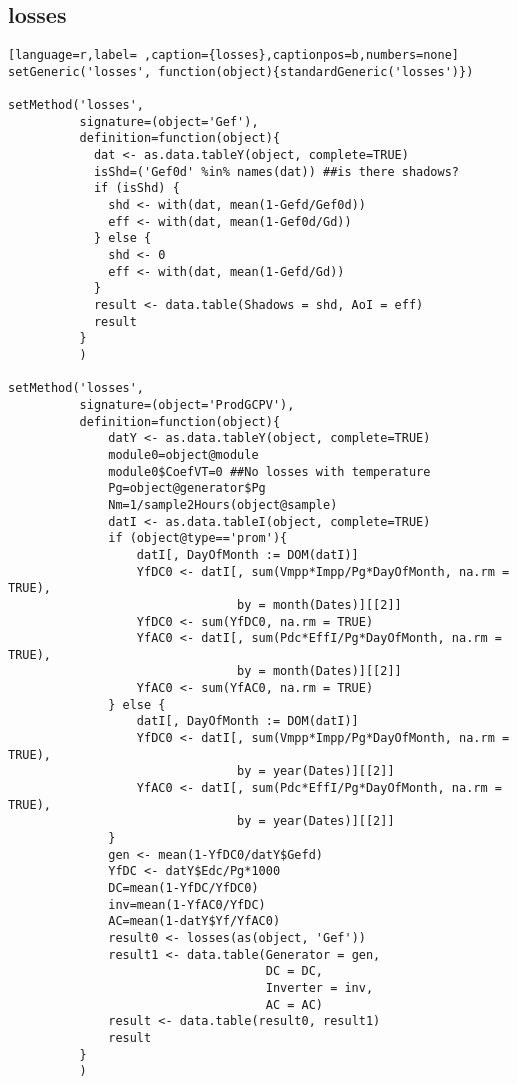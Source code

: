 \subsection{losses}
\label{sec:orgef956df}
\label{subsec:losses}
\begin{lstlisting}[language=r,label= ,caption={losses},captionpos=b,numbers=none]
setGeneric('losses', function(object){standardGeneric('losses')})

setMethod('losses',
          signature=(object='Gef'),
          definition=function(object){
            dat <- as.data.tableY(object, complete=TRUE)
            isShd=('Gef0d' %in% names(dat)) ##is there shadows?
            if (isShd) {
              shd <- with(dat, mean(1-Gefd/Gef0d))
              eff <- with(dat, mean(1-Gef0d/Gd))
            } else {
              shd <- 0
              eff <- with(dat, mean(1-Gefd/Gd))
            }
            result <- data.table(Shadows = shd, AoI = eff)
            result
          }
          )

setMethod('losses',
          signature=(object='ProdGCPV'),
          definition=function(object){
              datY <- as.data.tableY(object, complete=TRUE)
              module0=object@module
              module0$CoefVT=0 ##No losses with temperature
              Pg=object@generator$Pg
              Nm=1/sample2Hours(object@sample)
              datI <- as.data.tableI(object, complete=TRUE)
              if (object@type=='prom'){
                  datI[, DayOfMonth := DOM(datI)]
                  YfDC0 <- datI[, sum(Vmpp*Impp/Pg*DayOfMonth, na.rm = TRUE),
                                by = month(Dates)][[2]]
                  YfDC0 <- sum(YfDC0, na.rm = TRUE)
                  YfAC0 <- datI[, sum(Pdc*EffI/Pg*DayOfMonth, na.rm = TRUE),
                                by = month(Dates)][[2]]
                  YfAC0 <- sum(YfAC0, na.rm = TRUE)
              } else {
                  datI[, DayOfMonth := DOM(datI)]
                  YfDC0 <- datI[, sum(Vmpp*Impp/Pg*DayOfMonth, na.rm = TRUE),
                                by = year(Dates)][[2]]
                  YfAC0 <- datI[, sum(Pdc*EffI/Pg*DayOfMonth, na.rm = TRUE),
                                by = year(Dates)][[2]]     
              }
              gen <- mean(1-YfDC0/datY$Gefd)
              YfDC <- datY$Edc/Pg*1000
              DC=mean(1-YfDC/YfDC0)
              inv=mean(1-YfAC0/YfDC)
              AC=mean(1-datY$Yf/YfAC0)
              result0 <- losses(as(object, 'Gef'))
              result1 <- data.table(Generator = gen,
                                    DC = DC,
                                    Inverter = inv,
                                    AC = AC)
              result <- data.table(result0, result1)
              result
          }
          )


\end{lstlisting}
